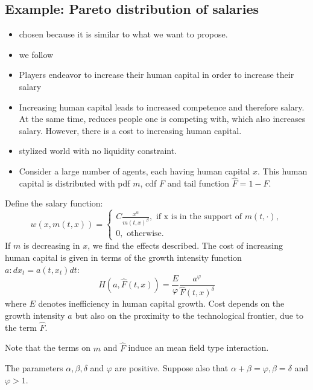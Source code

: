 \documentclass{article}
\begin{document}
\subsection{Example: Pareto distribution of salaries}

\begin{itemize}
    \item chosen because it is similar to what we want to propose.
    \item we follow \cite{cousin2010paris}
    \item Players endeavor to increase their human capital in order to increase their salary
    \item Increasing human capital leads to increased competence and therefore salary. At the same time, reduces people one is competing with, which also increases salary. However, there is a cost to increasing human capital.
    \item stylized world with no liquidity constraint.
    \item Consider a large number of agents, each having human capital $x$. This human capital is distributed with pdf $m$, cdf $F$ and tail function $\hat F = 1 - F$.
\end{itemize}

Define the salary function:
\begin{equation}
    w(x, m(t,x)) = \begin{cases}
        C \frac{x^\alpha}{m(t,x)^\beta}, \text{ if x is in the support of } m(t,\cdot),\\
        0,\text{ otherwise.}
    \end{cases}
\end{equation}
If $m$ is decreasing in $x$, we find the effects described.
The cost of increasing human capital is given in terms of the growth intensity function $a: dx_t = a(t,x_t) dt$:
\begin{equation}
    H(a, \hat F(t,x)) = \frac{E}{\varphi} \frac{ a^\varphi}{\hat F(t,x)^\delta}
\end{equation}
where $E$ denotes inefficiency in human capital growth. Cost depends on the growth intensity $a$ but also on the proximity to the technological frontier, due to the term $\hat F$.

Note that the terms on $m$ and $\hat F$ induce an mean field type interaction.

The parameters $\alpha, \beta, \delta$ and $\varphi$ are positive. Suppose also that $\alpha + \beta = \varphi, \beta = \delta$ and $\varphi > 1$. 
\end{document}

